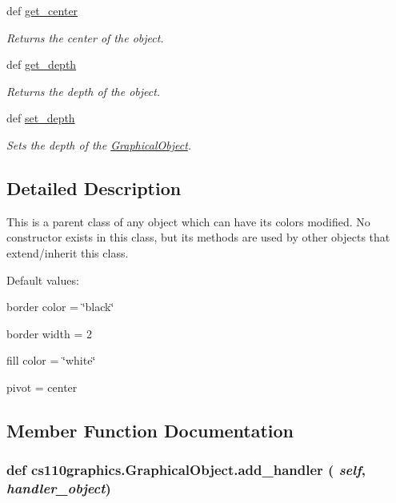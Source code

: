 \begin{DoxyCompactItemize}
def \hyperlink{classcs110graphics_1_1GraphicalObject_a062789c4cc9de38af32dcc4ff2058607}{get\_\-center}
\begin{DoxyCompactList}\small\item\em Returns the center of the object. \item\end{DoxyCompactList}\item 
def \hyperlink{classcs110graphics_1_1GraphicalObject_a6d9f5718cd0cf249e0d2842971bae17f}{get\_\-depth}
\begin{DoxyCompactList}\small\item\em Returns the depth of the object. \item\end{DoxyCompactList}\item 
def \hyperlink{classcs110graphics_1_1GraphicalObject_a20d76d4ee4419c3065d61deb6cbc6700}{set\_\-depth}
\begin{DoxyCompactList}\small\item\em Sets the depth of the \hyperlink{classcs110graphics_1_1GraphicalObject}{GraphicalObject}. \item\end{DoxyCompactList}\end{DoxyCompactItemize}


\subsection{Detailed Description}
This is a parent class of any object which can have its colors modified. No constructor exists in this class, but its methods are used by other objects that extend/inherit this class.

Default values:
\begin{DoxyItemize}
\item border color = \char`\"{}black\char`\"{}
\item border width = 2
\item fill color = \char`\"{}white\char`\"{}
\item pivot = center 
\end{DoxyItemize}

\subsection{Member Function Documentation}
\hypertarget{classcs110graphics_1_1GraphicalObject_adb1af0d5a6baae3f9a08d21a3227c49f}{
\subsubsection[{add\_\-handler}]{\setlength{\rightskip}{0pt plus 5cm}def cs110graphics.GraphicalObject.add\_\-handler ( {\em self}, \/   {\em handler\_\-object})}}
\label{classcs110graphics_1_1GraphicalObject_adb1af0d5a6baae3f9a08d21a3227c49f}


